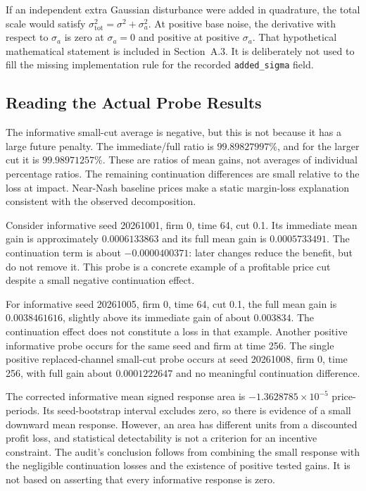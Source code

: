 \documentclass{article}
\begin{document}
If an independent extra Gaussian disturbance were added in quadrature, the total scale would satisfy $\sigma_{\mathrm{tot}}^2=\sigma^2+\sigma_a^2$. At positive base noise, the derivative with respect to $\sigma_a$ is zero at $\sigma_a=0$ and positive at positive $\sigma_a$. That hypothetical mathematical statement is included in Section~A.3. It is deliberately not used to fill the missing implementation rule for the recorded \texttt{added\_sigma} field.

\subsection{Reading the Actual Probe Results}

The informative small-cut average is negative, but this is not because it has a large future penalty. The immediate/full ratio is $99.89827997\%$, and for the larger cut it is $99.98971257\%$. These are ratios of mean gains, not averages of individual percentage ratios. The remaining continuation differences are small relative to the loss at impact. Near-Nash baseline prices make a static margin-loss explanation consistent with the observed decomposition.

Consider informative seed 20261001, firm 0, time 64, cut 0.1. Its immediate mean gain is approximately $0.0006133863$ and its full mean gain is $0.0005733491$. The continuation term is about $-0.0000400371$: later changes reduce the benefit, but do not remove it. This probe is a concrete example of a profitable price cut despite a small negative continuation effect.

For informative seed 20261005, firm 0, time 64, cut 0.1, the full mean gain is $0.0038461616$, slightly above its immediate gain of about $0.003834$. The continuation effect does not constitute a loss in that example. Another positive informative probe occurs for the same seed and firm at time 256. The single positive replaced-channel small-cut probe occurs at seed 20261008, firm 0, time 256, with full gain about $0.0001222647$ and no meaningful continuation difference.

The corrected informative mean signed response area is $-1.3628785\times10^{-5}$ price-periods. Its seed-bootstrap interval excludes zero, so there is evidence of a small downward mean response. However, an area has different units from a discounted profit loss, and statistical detectability is not a criterion for an incentive constraint. The audit's conclusion follows from combining the small response with the negligible continuation losses and the existence of positive tested gains. It is not based on asserting that every informative response is zero.
\end{document}
